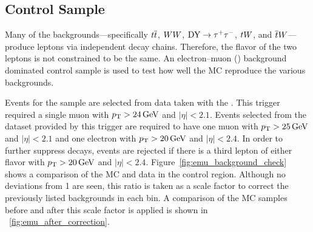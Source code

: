 


\subsection{\texorpdfstring{\emu}{Electron--Muon} Control Sample}
\label{ssec:emu_sample}

Many of the backgrounds---specifically $t\overline{t}$, $WW$, $\text{DY} \to \tau^{+} \tau^{-}$, $tW$,
and $\overline{t}W$---produce leptons via independent decay chains. Therefore, the
flavor of the two leptons is not constrained to be the same. An electron--muon
(\emu) background dominated control sample is used to test how well the MC
reproduce the various backgrounds.

Events for the \emu sample are selected from data taken with the
\SingleMuonTrigger. This trigger required a single muon with $p_{\mathrm{T}} > 24 \,\text{Ge\hspace{-.08em}V}$
and $|\eta| < 2.1$. Events selected from the dataset provided by this trigger
are required to have one muon with $p_{\mathrm{T}} > 25 \,\text{Ge\hspace{-.08em}V}$ and $|\eta| < 2.1$ and one
electron with $p_{\mathrm{T}} > 20 \,\text{Ge\hspace{-.08em}V}$ and $|\eta| < 2.4$. In order to further suppress
\Z decays, events are rejected if there is a third lepton of either flavor with
$p_{\mathrm{T}} > 20 \,\text{Ge\hspace{-.08em}V}$ and $|\eta| < 2.4$. Figure~\ref{fig:emu_background_check} shows a
comparison of the MC and data in the control region. Although no deviations
from \num{1} are seen, this ratio is taken as a scale factor to correct the
previously listed backgrounds in each bin. A comparison of the \Ztomumu MC
samples before and after this scale factor is applied is shown in
\FIG~\ref{fig:emu_after_correction}.

